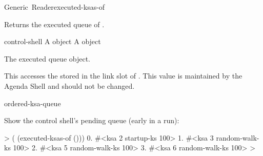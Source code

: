 \documentclass[10pt,twoside,english,pdftex]{article}
\begin{document}
\begin{functiondoc}{Generic~Reader}{executed-ksas-of}{ 
    \returns{} }
%
%

\fnsyntax

\fnpurpose Returns the executed  queue of
.

\fnmethods
{}

\fnpackage {}

\fnmodule {}

\fnargs
\begin{args}{control-shell}
 A  object
 A \textbf{} object
\end{args}

\fnreturns The executed  queue object.

\fndescription 
%
This  accesses the 
stored in the  link slot of . This value
is maintained by the Agenda Shell and should not be changed.

\begin{alsos}{ordered-ksa-queue}
\also[ksa]
\also[on-queue-p]
\also[queue]
\end{alsos}

\fnexample
%
%
%
%
%
Show the control shell's pending  queue (early in a
 run):
%
\W\supp
\begin{example}
  >  ( (executed-ksas-of ()))
      0. #<ksa 2 startup-ks 100>
      1. #<ksa 3 random-walk-ks 100>
      2. #<ksa 5 random-walk-ks 100>
      3. #<ksa 6 random-walk-ks 100>
  >
\end{example}

\end{functiondoc}

\end{document}
